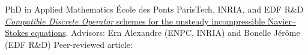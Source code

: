 \documentclass[english]{RMcv}
\begin{document}





%
%


%
        {PhD in Applied Mathematics}%
        {\'Ecole des Ponts ParisTech, INRIA, and EDF R\&D}%
        {\href{\PhDlink}{\emph{Compatible Discrete Operator} schemes for the unsteady incompressible Navier–Stokes equations}. Advisors: Ern Alexandre (ENPC, INRIA) and Bonelle J\'er\^ome (EDF R\&D)}%
        {Peer-reviewed article: \articlehref{}}

\end{document}
